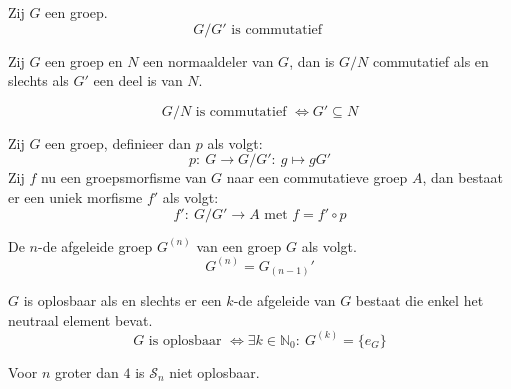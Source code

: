 \documentclass[main.tex]{subfiles}
\begin{document}
\begin{st}
Zij $G$ een groep.
\[ G/G' \text{ is commutatief } \]
\end{st}

\begin{st}
Zij $G$ een groep en $N$ een normaaldeler van $G$, dan is $G/N$ commutatief als en slechts als $G'$ een deel is van $N$.

\[ G/N \text{ is commutatief } \Leftrightarrow G' \subseteq N \]
\end{st}

\begin{st}
Zij $G$ een groep, definieer dan $p$ als volgt:
\[ p:\ G \rightarrow G/G':\ g \mapsto gG' \]
Zij $f$ nu een groepsmorfisme van $G$ naar een commutatieve groep $A$, dan bestaat er een uniek morfisme $f'$ als volgt:
\[ f':\ G/G' \rightarrow A \text{ met } f = f'\circ p \]
\end{st}

\begin{de}
De $n$-de afgeleide groep $G^{(n)}$ van een groep $G$ als volgt.
\[ G^{(n)} = G_{(n-1)}' \]
\end{de}

\begin{pr}
$G$ is oplosbaar als en slechts er een $k$-de afgeleide van $G$ bestaat die enkel het neutraal element bevat.
\[ G \text{ is oplosbaar } \Leftrightarrow \exists k\in\mathbb{N}_{0}:\ G^{(k)} = \{e_{G}\} \]
\end{pr}

\begin{st}
Voor $n$ groter dan $4$ is $\mathcal{S}_{n}$ niet oplosbaar.
\end{st}
\end{document}
